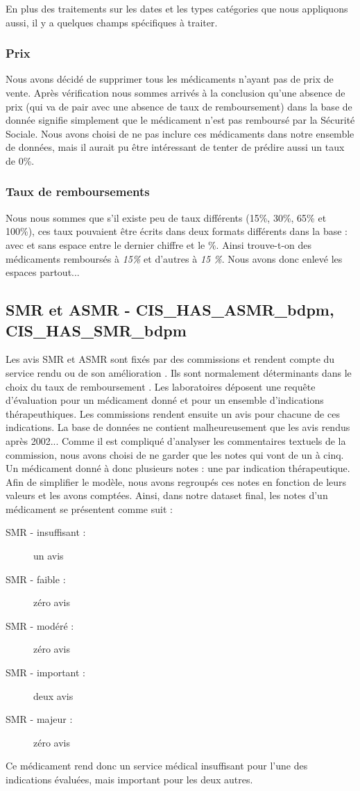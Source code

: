 \documentclass[a4paper, 12pt]{article}
\begin{document}
En plus des traitements sur les dates et les types catégories que nous appliquons aussi, il y a quelques champs spécifiques à traiter.

\subsubsection*{Prix}

Nous avons décidé de supprimer tous les médicaments n'ayant pas de prix de vente. Après vérification nous sommes arrivés à la conclusion qu'une absence de prix (qui va de pair avec une absence de taux de remboursement) dans la base de donnée signifie simplement que le médicament n'est pas remboursé par la Sécurité Sociale. Nous avons choisi de ne pas inclure ces médicaments dans notre ensemble de données, mais il aurait pu être intéressant de tenter de prédire aussi un taux de 0\%.

\subsubsection*{Taux de remboursements}

Nous nous sommes que s'il existe peu de taux différents (15\%, 30\%, 65\% et 100\%), ces taux pouvaient être écrits dans deux formats différents dans la base : avec et sans espace entre le dernier chiffre et le \%. Ainsi trouve-t-on des médicaments remboursés à \textit{15\%} et d'autres à \textit{15 \%}. Nous avons donc enlevé les espaces partout...

\subsection{SMR et ASMR - CIS\_HAS\_ASMR\_bdpm, CIS\_HAS\_SMR\_bdpm}

Les avis SMR et ASMR sont fixés par des commissions et rendent compte du service rendu ou de son amélioration \cite{smrasmr}. Ils sont normalement déterminants dans le choix du taux de remboursement \cite{fixation}. Les laboratoires déposent une requête d'évaluation pour un médicament donné et pour un ensemble d'indications thérapeuthiques. Les commissions rendent ensuite un avis pour chacune de ces indications. La base de données ne contient malheureusement que les avis rendus après 2002... Comme il est compliqué d'analyser les commentaires textuels de la commission, nous avons choisi de ne garder que les notes qui vont de un à cinq. Un médicament donné à donc plusieurs notes : une par indication thérapeutique. Afin de simplifier le modèle, nous avons regroupés ces notes en fonction de leurs valeurs et les avons comptées. Ainsi, dans notre dataset final, les notes d'un médicament se présentent comme suit :
\begin{description}
\item[SMR - insuffisant :] un avis
\item[SMR - faible :] zéro avis
\item[SMR - modéré :] zéro avis
\item[SMR - important :] deux avis
\item[SMR - majeur :] zéro avis
\end{description}
Ce médicament rend donc un service médical insuffisant pour l'une des indications évaluées, mais important pour les deux autres.
\end{document}
